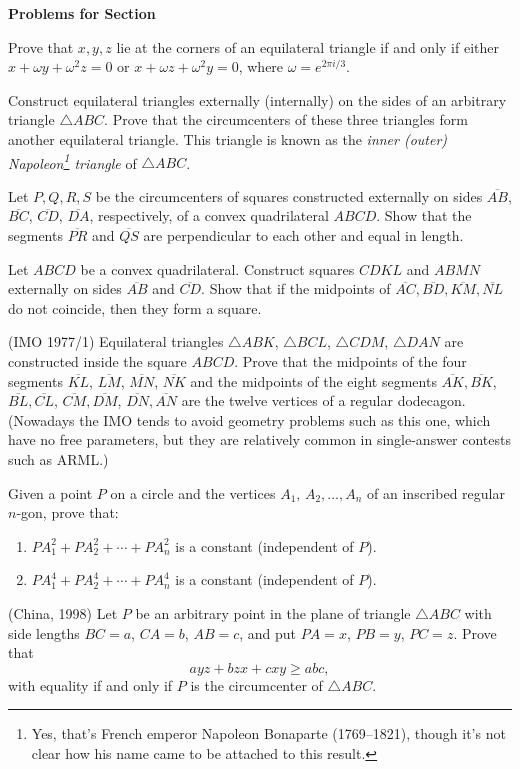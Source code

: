 \documentclass[12pt]{book}
\newcounter{exc}
\numberwithin{exc}{section}
\numberwithin{figure}{section}
\newenvironment{exer}{\vspace{0.1in}
\noindent \textbf{Problems for Section~\thesection} \vspace{0.1in}
\begin{list}{\arabic{exc}.}{\usecounter{exc}}}{\end{list}}
\numberwithin{equation}{theorem}
\def\ii{\item}
\def\seg#1{\overline{#1}}
\begin{document}
\begin{exer}
\ii
Prove that $x,y,z$ lie at the corners of an equilateral triangle if 
and only if either $x + \omega y + \omega^{2} z = 0$ or $x + 
\omega z + \omega^{2} y = 0$, where $\omega = e^{2\pi i/3}$.

\ii
Construct equilateral triangles externally (internally) on 
the sides of an arbitrary triangle $\triangle ABC$. 
Prove that the circumcenters of 
these three triangles form another equilateral triangle. This 
triangle is known as the \emph{inner (outer) Napoleon\footnote{Yes,
that's French emperor 
Napoleon Bonaparte (1769--1821), 
 though it's not clear how his name came to
be attached to this result.} triangle} 
of $\triangle ABC$.

\ii
Let $P,Q,R,S$ be the circumcenters of squares constructed externally on 
sides $\seg{AB}$, $\seg{BC}$, $\seg{CD}$, $\seg{DA}$, 
respectively, of a convex quadrilateral $ABCD$. 
Show that the segments $\seg{PR}$ and $\seg{QS}$ are perpendicular to each other 
and equal in length.

\ii
Let $ABCD$ be a convex quadrilateral. Construct squares $CDKL$ and
$ABMN$ externally on sides $\seg{AB}$ and $\seg{CD}$. 
Show that if the midpoints of
$\seg{AC}, \seg{BD}, \seg{KM}, \seg{NL}$ do not coincide, 
then they form a square.

\ii (IMO 1977/1)
Equilateral triangles $\triangle ABK$, $\triangle BCL$, $\triangle CDM$, 
$\triangle DAN$ are constructed 
inside the square $ABCD$. Prove that the midpoints of the four 
segments $\seg{KL}$, $\seg{LM}$, $\seg{MN}$, $\seg{NK}$ 
and the midpoints of the eight segments 
$\seg{AK}, \seg{BK}$, $\seg{BL}, \seg{CL}$, $\seg{CM}, \seg{DM}$, $\seg{DN}, 
\seg{AN}$ are the twelve vertices of a 
regular dodecagon. (Nowadays the IMO tends to avoid geometry problems 
such as this one, which have no free parameters, but they are 
relatively common in single-answer contests such as ARML.)

\ii
Given a point $P$ on a circle and the
vertices $A_1,\,A_2,\dots,A_n$ of an inscribed regular $n$-gon, prove that:
\begin{enumerate}
\ii $PA_1^2+PA_2^2+\cdots+PA_n^2$ is a constant (independent of $P$). 
\ii $PA_1^4+PA_2^4+\cdots+PA_n^4$ is a constant (independent of $P$).
\end{enumerate}

\ii (China, 1998)
Let $P$ be an arbitrary point in the plane of triangle
$\triangle 
ABC$ with side lengths $BC=a$, $CA=b$, $AB=c$, and put $PA=x$, $PB=y$,
$PC=z$.  Prove that
\[
ayz+bzx+cxy\geq abc,
\]
with equality if and only if $P$ is the circumcenter of $\triangle ABC$.
\end{exer}
\end{document}
